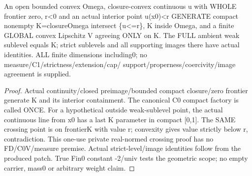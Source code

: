 \begin{lemma}
  \label{lem:negative-sublevel-extension}
  \leanok
  An open bounded convex Omega, closure-convex continuous u with WHOLE frontier
  zero, r<0 and an actual interior point u(x0)<r GENERATE compact nonempty
  K=closureOmega intersect \{u<=r\}, K inside Omega, and a finite GLOBAL convex
  Lipschitz V agreeing ONLY on K. The FULL ambient weak sublevel equals K;
  strict sublevels and all supporting images there have actual identities.
  ALL finite dimensions including0; no measure/C1/strictness/extension/cap/
  support/properness/coercivity/image agreement is supplied.
\end{lemma}
\begin{proof}
  \leanok
  Actual continuity/closed preimage/bounded compact closure/zero frontier
  generate K and its interior containment. The canonical C0 compact factory
  is called ONCE. For a hypothetical outside weak-sublevel point, the actual
  continuous line from x0 has a last K parameter in compact [0,1]. The SAME
  crossing point is on frontierK with value r; convexity gives value strictly
  below r, contradiction. This one-use private real-normed crossing proof has
  no FD/C0V/measure premise. Actual strict-level/image identities follow from
  the produced patch. True Fin0 constant -2/univ tests the geometric scope;
  no empty carrier, mass0 or arbitrary weight claim.
\end{proof}

